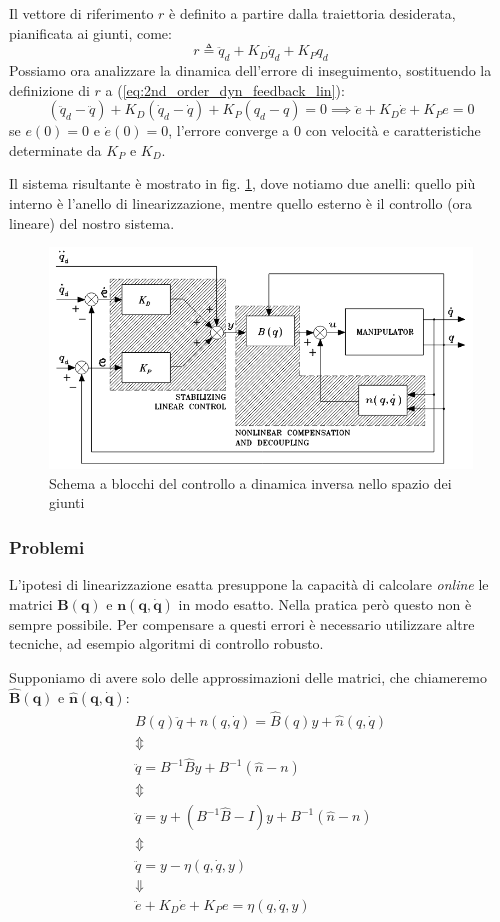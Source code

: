 \boldmath
Il vettore di riferimento $r$ è definito a partire dalla traiettoria desiderata, pianificata ai giunti, come:
$$
r \triangleq \ddot{q}_d + K_D \dot{q}_d + K_P q_d 
$$
Possiamo ora analizzare la dinamica dell'errore di inseguimento, sostituendo la definizione di $r$ a (\ref{eq:2nd_order_dyn_feedback_lin}):
$$
(\ddot{q}_d - \ddot{q}) + K_D(\dot{q}_d - \dot{q}) + K_P(q_d - q) = 0
\implies
\ddot{e} + K_D\dot{e} + K_Pe = 0
$$
se $e(0) = 0$ e $\dot{e}(0) = 0$, l'errore converge a 0 con velocità e caratteristiche determinate da $K_P$ e $K_D$.
\unboldmath

Il sistema risultante è mostrato in fig. \ref{fig:centralizedcontrol2}, dove notiamo due anelli: quello più interno è l'anello di linearizzazione, mentre quello esterno è il controllo (ora lineare) del nostro sistema.

\begin{figure}
	\centering
	\includegraphics[width=0.7\linewidth]{images/centralized_control_2}
	\caption{Schema a blocchi del controllo a dinamica inversa nello spazio dei giunti}
	\label{fig:centralizedcontrol2}
\end{figure}


\vspace*{20pt}
\subsubsection{Problemi}
L’ipotesi di linearizzazione esatta presuppone la capacità di calcolare \textit{online} le matrici $\mathbf{B(q)}$ e $\mathbf{n(q, \dot{q})}$ in modo esatto. Nella pratica però questo non è sempre possibile.
Per compensare a questi errori è necessario utilizzare altre tecniche, ad esempio algoritmi di controllo robusto.

Supponiamo di avere solo delle approssimazioni delle matrici, che chiameremo $\mathbf{\hat{B}(q)}$ e $\mathbf{\hat{n}(q, \dot{q})}$:
\boldmath
\begin{gather*}
B(q)\ddot{q} + n(q, \dot{q}) = \hat{B}(q)y + \hat{n}(q, \dot{q}) \\
\Updownarrow \\
\ddot{q} = B^{-1}\hat{B}y + B^{-1}(\hat{n} - n) \\
\Updownarrow \\
\ddot{q} = y + (B^{-1}\hat{B} - I)y + B^{-1}(\hat{n} - n) \\
\Updownarrow \\
\ddot{q} = y - \eta(q, \dot{q}, y) \\
\Downarrow \\
\ddot{e} + K_D\dot{e} + K_Pe = \eta(q, \dot{q}, y)
\end{gather*}

